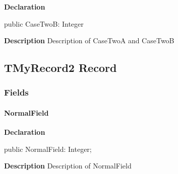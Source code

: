 \documentclass{report}
\begin{document}
\begin{list}{}{
\setlength{\itemindent}{0cm}
\setlength{\listparindent}{0cm}
\setlength{\leftmargin}{\evensidemargin}
\addtolength{\leftmargin}{\tmplength}
\settowidth{\labelsep}{X}
\addtolength{\leftmargin}{\labelsep}
\setlength{\labelwidth}{\tmplength}
}
\begin{flushleft}
\item[\textbf{Declaration}\hfill]
\begin{ttfamily}
public CaseTwoB: Integer\end{ttfamily}


\end{flushleft}
\par
\item[\textbf{Description}]
Description of CaseTwoA and CaseTwoB

\end{list}
\subsection*{TMyRecord2 Record}
\subsubsection*{\large{\textbf{Fields}}\normalsize\hspace{1ex}\hfill}
\paragraph*{NormalField}\hspace*{\fill}

\begin{list}{}{
\setlength{\itemindent}{0cm}
\setlength{\listparindent}{0cm}
\setlength{\leftmargin}{\evensidemargin}
\addtolength{\leftmargin}{\tmplength}
\settowidth{\labelsep}{X}
\addtolength{\leftmargin}{\labelsep}
\setlength{\labelwidth}{\tmplength}
}
\begin{flushleft}
\item[\textbf{Declaration}\hfill]
\begin{ttfamily}
public NormalField: Integer;\end{ttfamily}


\end{flushleft}
\par
\item[\textbf{Description}]
Description of NormalField

\end{list}
\end{document}
